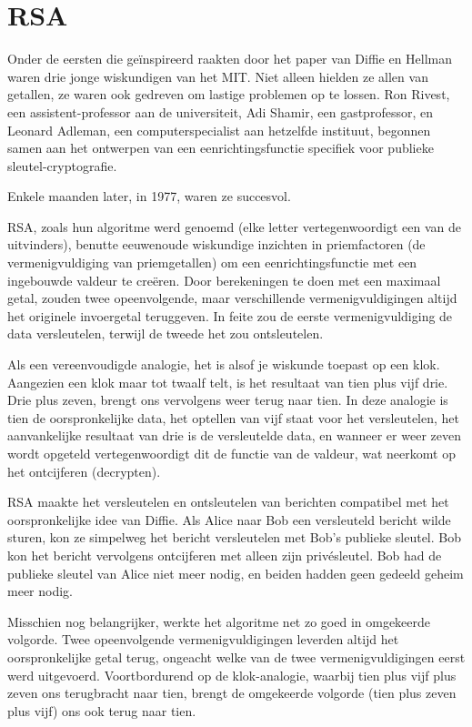\documentclass[smalldemyvopaper,11pt,twoside,onecolumn,openright,extrafontsizes,hidelinks]{memoir}
\begin{document}
\section{RSA}\label{rsa}

Onder de eersten die geïnspireerd raakten door het paper van Diffie en
Hellman waren drie jonge wiskundigen van het MIT. Niet alleen hielden ze
allen van getallen, ze waren ook gedreven om lastige problemen op te
lossen. Ron Rivest, een assistent-professor aan de universiteit, Adi
Shamir, een gastprofessor, en Leonard Adleman, een computerspecialist
aan hetzelfde instituut, begonnen samen aan het ontwerpen van een
eenrichtingsfunctie specifiek voor publieke sleutel-cryptografie.

Enkele maanden later, in 1977, waren ze succesvol.

RSA, zoals hun algoritme werd genoemd (elke letter vertegenwoordigt een
van de uitvinders), benutte eeuwenoude wiskundige inzichten in
priemfactoren (de vermenigvuldiging van priemgetallen) om een
eenrichtingsfunctie met een ingebouwde valdeur te creëren. Door
berekeningen te doen met een maximaal getal, zouden twee opeenvolgende,
maar verschillende vermenigvuldigingen altijd het originele invoergetal
teruggeven. In feite zou de eerste vermenigvuldiging de data
versleutelen, terwijl de tweede het zou ontsleutelen.

Als een vereenvoudigde analogie, het is alsof je wiskunde toepast op een
klok. Aangezien een klok maar tot twaalf telt, is het resultaat van tien
plus vijf drie. Drie plus zeven, brengt ons vervolgens weer terug naar
tien. In deze analogie is tien de oorspronkelijke data, het optellen van
vijf staat voor het versleutelen, het aanvankelijke resultaat van drie
is de versleutelde data, en wanneer er weer zeven wordt opgeteld
vertegenwoordigt dit de functie van de valdeur, wat neerkomt op het
ontcijferen (decrypten).

RSA maakte het versleutelen en ontsleutelen van berichten compatibel met
het oorspronkelijke idee van Diffie. Als Alice naar Bob een versleuteld
bericht wilde sturen, kon ze simpelweg het bericht versleutelen met
Bob's publieke sleutel. Bob kon het bericht vervolgens ontcijferen met
alleen zijn privésleutel. Bob had de publieke sleutel van Alice niet
meer nodig, en beiden hadden geen gedeeld geheim meer nodig.

Misschien nog belangrijker, werkte het algoritme net zo goed in
omgekeerde volgorde. Twee opeenvolgende vermenigvuldigingen leverden
altijd het oorspronkelijke getal terug, ongeacht welke van de twee
vermenigvuldigingen eerst werd uitgevoerd. Voortbordurend op de
klok-analogie, waarbij tien plus vijf plus zeven ons terugbracht naar
tien, brengt de omgekeerde volgorde (tien plus zeven plus vijf) ons ook
terug naar tien.
\end{document}
